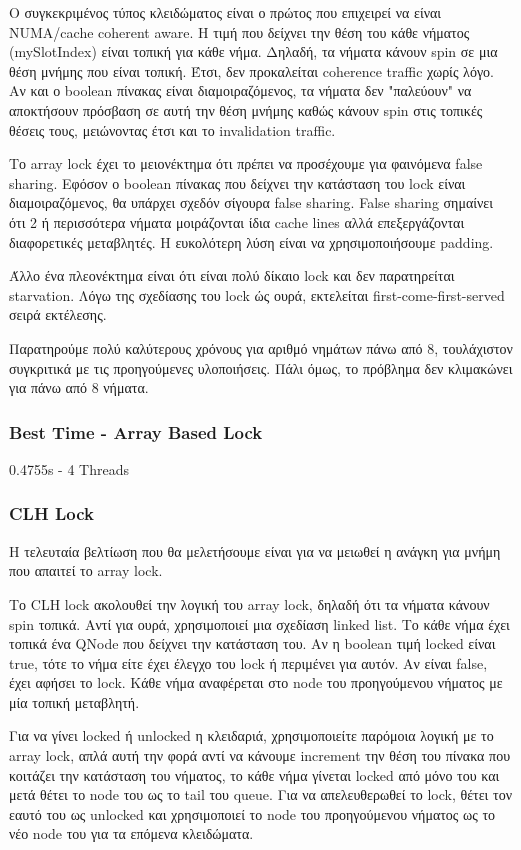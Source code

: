 \documentclass[../final_report.tex]{subfiles}
\begin{document}
Ο συγκεκριμένος τύπος κλειδώματος είναι ο πρώτος που επιχειρεί να είναι NUMA/cache coherent aware. Η τιμή που δείχνει
την θέση του κάθε νήματος (mySlotIndex) είναι τοπική για κάθε νήμα. Δηλαδή, τα νήματα κάνουν spin σε μια θέση 
μνήμης που είναι τοπική. Έτσι, δεν προκαλείται coherence traffic χωρίς λόγο. Αν και ο boolean πίνακας είναι 
διαμοιραζόμενος, τα νήματα δεν "παλεύουν" να αποκτήσουν πρόσβαση σε αυτή την θέση μνήμης καθώς κάνουν
spin στις τοπικές θέσεις τους, μειώνοντας έτσι και το invalidation traffic.

Το array lock έχει το μειονέκτημα ότι πρέπει να προσέχουμε για φαινόμενα false sharing. Εφόσον ο boolean πίνακας που 
δείχνει την κατάσταση του lock είναι διαμοιραζόμενος, θα υπάρχει σχεδόν σίγουρα false sharing. False sharing 
σημαίνει ότι 2 ή περισσότερα νήματα μοιράζονται ίδια cache lines αλλά επεξεργάζονται διαφορετικές μεταβλητές.
Η ευκολότερη λύση είναι να χρησιμοποιήσουμε padding.

Άλλο ένα πλεονέκτημα είναι ότι είναι πολύ δίκαιο lock και δεν παρατηρείται starvation. Λόγω της σχεδίασης του lock ώς
ουρά, εκτελείται first-come-first-served σειρά εκτέλεσης.

Παρατηρούμε πολύ καλύτερους χρόνους για αριθμό νημάτων πάνω από 8, τουλάχιστον συγκριτικά με τις προηγούμενες υλοποιήσεις. 
Πάλι όμως, το πρόβλημα δεν κλιμακώνει για πάνω από 8 νήματα. 

\subsubsection*{Best Time - Array Based Lock}
0.4755s - 4 Threads

\subsubsection{CLH Lock}

Η τελευταία βελτίωση που θα μελετήσουμε είναι για να μειωθεί η ανάγκη για μνήμη που απαιτεί το array lock.

Το CLH lock ακολουθεί την λογική του array lock, δηλαδή ότι τα νήματα κάνουν spin τοπικά. Αντί για ουρά,
χρησιμοποιεί μια σχεδίαση linked list. Το κάθε νήμα έχει τοπικά ένα QNode που δείχνει την κατάσταση του.
Αν η boolean τιμή locked είναι true, τότε το νήμα είτε έχει έλεγχο του lock ή περιμένει για αυτόν. Αν είναι false,
έχει αφήσει το lock. Κάθε νήμα αναφέρεται στο node του προηγούμενου νήματος με μία τοπική μεταβλητή.

Για να γίνει locked ή unlocked η κλειδαριά, χρησιμοποιείτε παρόμοια λογική με το array lock, απλά αυτή την φορά
αντί να κάνουμε increment την θέση του πίνακα που κοιτάζει την κατάσταση του νήματος, το κάθε νήμα
γίνεται locked από μόνο του και μετά θέτει το node του ως το tail του queue. Για να απελευθερωθεί το lock, 
θέτει τον εαυτό του ως unlocked και χρησιμοποιεί το node του προηγούμενου νήματος ως το νέο node του για 
τα επόμενα κλειδώματα.
\end{document}
